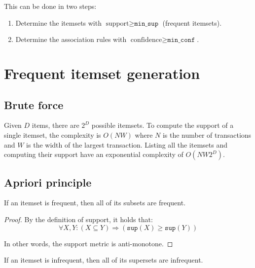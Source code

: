 \begin{description}
        This can be done in two steps:
        \begin{enumerate}
            \item {}
                Determine the itemsets with $\text{support} \geq \texttt{min\_sup}$ (frequent itemsets).
            \item {}
                Determine the association rules with $\text{confidence} \geq \texttt{min\_conf}$.
        \end{enumerate}
\end{description}



\section{Frequent itemset generation}

\subsection{Brute force}
Given $D$ items, there are $2^D$ possible itemsets.
To compute the support of a single itemset, the complexity is $O(NW)$ where 
$N$ is the number of transactions and $W$ is the width of the largest transaction.
Listing all the itemsets and computing their support have an exponential complexity of $O(NW2^D)$.


\subsection{Apriori principle}

\begin{theorem} 
    If an itemset is frequent, then all of its subsets are frequent.

    \begin{proof}
        By the definition of support, it holds that:
        \[ \forall X, Y: (X \subseteq Y) \Rightarrow (\texttt{sup}(X) \geq \texttt{sup}(Y)) \]

        In other words, the support metric is anti-monotone.
    \end{proof}
\end{theorem}

\begin{corollary}
    If an itemset is infrequent, then all of its supersets are infrequent.
\end{corollary}

